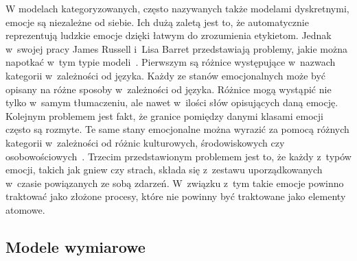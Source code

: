 W modelach kategoryzowanych, często nazywanych także modelami dyskretnymi, emocje są niezależne od siebie. Ich dużą zaletą jest to, że automatycznie reprezentują ludzkie emocje dzięki łatwym do zrozumienia etykietom. Jednak w~swojej pracy James Russell i~Lisa Barret przedstawiają problemy, jakie można napotkać w~tym typie modeli~\cite{russel_barret_core_affect}. Pierwszym są różnice występujące w~nazwach kategorii w~zależności od języka. Każdy ze stanów emocjonalnych może być opisany na różne sposoby w~zależności od języka. Różnice mogą wystąpić nie tylko w~samym tłumaczeniu, ale nawet w~ilości słów opisujących daną emocję. Kolejnym problemem jest fakt, że granice pomiędzy danymi klasami emocji często są rozmyte. Te same stany emocjonalne można wyrazić za pomocą różnych kategorii w~zależności od różnic kulturowych, środowiskowych czy osobowościowych~\cite{emotion_models_review_2017}. Trzecim przedstawionym problemem jest to, że każdy z~typów emocji, takich jak gniew czy strach, składa się z~zestawu uporządkowanych w~czasie powiązanych ze sobą zdarzeń. W~związku z~tym takie emocje powinno traktować jako złożone procesy, które nie powinny być traktowane jako elementy atomowe.

\subsection{Modele wymiarowe}

